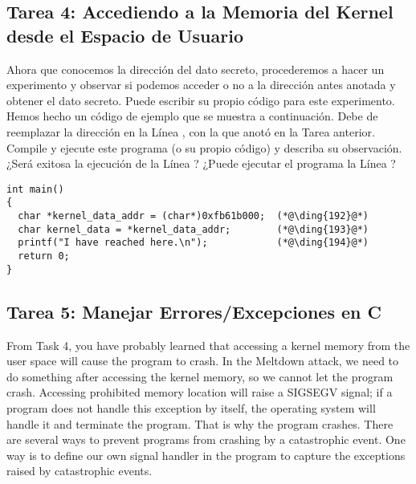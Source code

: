 \subsection{Tarea 4: Accediendo a la Memoria del Kernel desde el Espacio de Usuario}

Ahora que conocemos la dirección del dato secreto, procederemos a hacer un experimento y observar si podemos acceder o no a la dirección antes anotada y obtener el dato secreto.
Puede escribir su propio código para este experimento. Hemos hecho un código de ejemplo que se muestra a continuación. Debe de reemplazar la dirección en la Línea , con la que anotó en la Tarea anterior.
Compile y ejecute este programa (o su propio código) y describa su observación.
¿Será exitosa la ejecución de la Línea ? ¿Puede ejecutar el programa la Línea ?


\begin{lstlisting}
int main()
{
  char *kernel_data_addr = (char*)0xfb61b000;  (*@\ding{192}@*)
  char kernel_data = *kernel_data_addr;        (*@\ding{193}@*)
  printf("I have reached here.\n");            (*@\ding{194}@*)
  return 0;
}
\end{lstlisting}



\subsection{Tarea 5: Manejar Errores/Excepciones en C}


From Task 4, you have probably learned that accessing a kernel memory from the user space will
cause the program to crash. In the Meltdown attack, we need to do something 
after accessing the kernel memory, so we cannot let the program crash. 
Accessing prohibited memory location will raise a SIGSEGV signal; if a program does not 
handle this exception by itself, the operating system will handle it and terminate the 
program. That is why the program crashes. There are several ways to prevent
programs from crashing by a catastrophic event. 
One way is to define our own signal handler in the program to capture
the exceptions raised by catastrophic events. 


